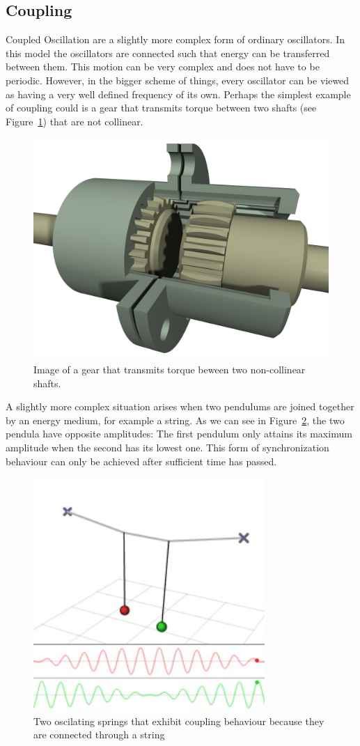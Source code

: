 \subsection{Coupling}
Coupled Oscillation are a slightly more complex form of ordinary oscillators. In this model the oscillators are connected such that energy can be transferred between them. This motion can be very complex and does not have to be periodic. However, in the bigger scheme of things, every oscillator can be viewed as having a very well defined frequency of its own. Perhaps the simplest example of coupling could is a gear that transmits torque between two shafts (see Figure~\ref{fig:intro_gear}) that are not collinear. 

\begin{figure}[h]
  \centering
  \includegraphics[width=.5\textwidth]{imgs/gear}
  \caption{Image of a gear that transmits torque beween two non-collinear shafts. }
  \label{fig:intro_gear}
\end{figure}

A slightly more complex situation arises when two pendulums are joined together by an energy medium, for example a string. As we can see in Figure~\ref{fig:intro_couple}, the two pendula have opposite amplitudes: The first pendulum only attains its maximum amplitude when the second has its lowest one. This form of synchronization behaviour can only be achieved after sufficient time has passed. 

\begin{figure}[h]
\centering
\includegraphics[width=.5\textwidth]{imgs/couple}
\caption{Two oscilating springs that exhibit coupling behaviour because they are connected through a string}
\label{fig:intro_couple}
\end{figure}

